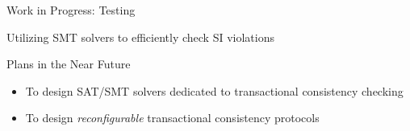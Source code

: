 
\begin{frame}{Work in Progress: Testing}
  \begin{center}

    \vspace{0.50cm}
    Utilizing SMT solvers to efficiently check SI violations
  \end{center}
\end{frame}

\begin{frame}{Plans in the Near Future}
  \begin{itemize}
    \setlength{\itemsep}{8pt}
    \item To design SAT/SMT solvers dedicated to transactional consistency checking
    \item To design \emph{reconfigurable} transactional consistency protocols
  \end{itemize}
\end{frame}

